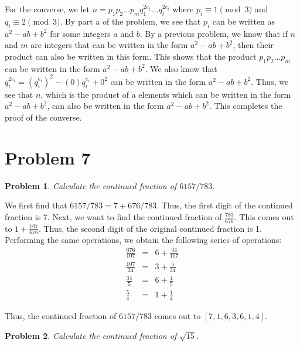\documentclass[psamsfonts]{amsart}
\newtheorem{prob}{Problem}[section]
\newenvironment{sol}{{\bfseries Solution}}{\qedsymbol}
\theoremstyle{definition}
\theoremstyle{remark}
\numberwithin{equation}{section}
\begin{document}
\begin{sol}
For the converse, we let $n = p_1 p_2 \ldots p_m q_1^{2 e_1} \ldots q_l^{2 e_l}$ where $p_i \equiv 1 \pmod{3}$ and $q_i \equiv 2 \pmod{3}$. By part a of the problem, we see that $p_i$ can be written as $a^2 - ab + b^2$ for some integers $a$ and $b$. By a previous problem, we know that if $n$ and $m$ are integers that can be written in the form $a^2 - ab + b^2$, then their product can also be written in this form. This shows that the product $p_1 p_2 \ldots p_m$ can be written in the form $a^2 - ab + b^2$. We also know that $q_i^{2 e_i} = (q_i^{e_i})^{2} - (0) q_i^{e_i} + 0^2$ can be written in the form $a^2 - ab + b^2$. Thus, we see that $n$, which is the product of a elements which can be written in the form $a^2 - ab + b^2$, can also be written in the form $a^2 - ab + b^2$. This completes the proof of the converse.
\end{sol}

\section{Problem 7}

\begin{prob}
Calculate the continued fraction of $6157/783$. 
\end{prob}

\begin{sol}
We first find that $6157/783 = 7 + 676/783$. Thus, the first digit of the continued fraction is 7. Next, we want to find the continued fraction of $\frac{783}{676}$. This comes out to $1 + \frac{107}{676}$. Thus, the second digit of the original continued fraction is 1. Performing the same operations, we obtain the following series of operations:
\begin{eqnarray}
\frac{676}{107} &=& 6 + \frac{34}{107} \\
\frac{107}{34} &=& 3 + \frac{5}{34} \\
\frac{34}{5} &=& 6 + \frac{4}{5} \\
\frac{5}{4} &=& 1 + \frac{1}{4} 
\end{eqnarray}

Thus, the continued fraction of $6157/783$ comes out to $[7,1,6,3,6,1,4]$. 
\end{sol}

\begin{prob}
Calculate the continued fraction of $\sqrt{15}$. 
\end{prob}
\end{document}
